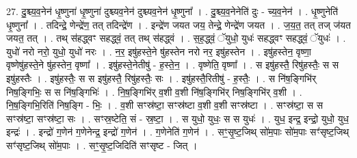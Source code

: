 \documentclass[17pt]{extarticle}
\begin{document}
27. दु॒श्च्य॒व॒नेन॑ धृ॒ष्णुना॑ धृ॒ष्णुना॑ दुश्च्यव॒नेन॑ दुश्च्यव॒नेन॑ धृ॒ष्णुना᳚ । . दु॒श्च्य॒व॒नेनेति॑ दुः - च्य॒व॒नेन॑ । . धृ॒ष्णुनेति॑ धृ॒ष्णुना᳚ । . तदिन्द्रे॒ णेन्द्रे॑ण॒ तत् तदिन्द्रे॑ण । . इन्द्रे॑ण जयत जय॒ तेन्द्रे॒ णेन्द्रे॑ण जयत । . ज॒य॒त॒ तत् तज् ज॑यत जयत॒ तत् । . तथ् स॑हद्ध्वꣳ सहद्ध्वं॒ तत् तथ् स॑हद्ध्वं । . स॒ह॒द्ध्वं॒ ॅयुधो॒ युधः॑ सहद्ध्वꣳ सहद्ध्वं॒ ॅयुधः॑ । . युधो॑ नरो नरो॒ युधो॒ युधो॑ नरः । . न॒र॒ इषु॑हस्ते॒ने षु॑हस्तेन नरो नर॒ इषु॑हस्तेन । . इषु॑हस्तेन॒ वृष्णा॒ वृष्णेषु॑हस्ते॒ने षु॑हस्तेन॒ वृष्णा᳚ । . इषु॑हस्ते॒नेतीषु॑ - ह॒स्ते॒न॒ । . वृष्णेति॒ वृष्णा᳚ । . स इषु॑हस्तै॒ रिषु॑हस्तैः॒ स स इषु॑हस्तैः । . इषु॑हस्तैः॒ स स इषु॑हस्तै॒ रिषु॑हस्तैः॒ सः । . इषु॑हस्तै॒रितीषु॑ - ह॒स्तैः॒ । . स नि॑ष॒ङ्गिभि॑र् निष॒ङ्गिभिः॒ स स नि॑ष॒ङ्गिभिः॑ । . नि॒ष॒ङ्गिभि॑र् व॒शी व॒शी नि॑ष॒ङ्गिभि॑र् निष॒ङ्गिभि॑र् व॒शी । . नि॒ष॒ङ्गिभि॒रिति॑ निष॒ङ्गि - भिः॒ । . व॒शी सꣳस्र॑ष्टा॒ सꣳस्र॑ष्टा व॒शी व॒शी सꣳस्र॑ष्टा । . सꣳस्र॑ष्टा॒ स स सꣳस्र॑ष्टा॒ सꣳस्र॑ष्टा॒ सः । . सꣳस्र॒ष्टेति॒ सं - स्र॒ष्टा॒ । . स युधो॒ युधः॒ स स युधः॑ । . युध॒ इन्द्र॒ इन्द्रो॒ युधो॒ युध॒ इन्द्रः॑ । . इन्द्रो॑ ग॒णेन॑ ग॒णेनेन्द्र॒ इन्द्रो॑ ग॒णेन॑ । . ग॒णेनेति॑ ग॒णेन॑ । . सꣳ॒॒सृ॒ष्ट॒जिथ् सो॑म॒पाः सो॑म॒पाः सꣳ॑सृष्ट॒जिथ् सꣳ॑सृष्ट॒जिथ् सो॑म॒पाः । . सꣳ॒॒सृ॒ष्ट॒जिदिति॑ सꣳसृष्ट - जित् । \newline
\end{document}
